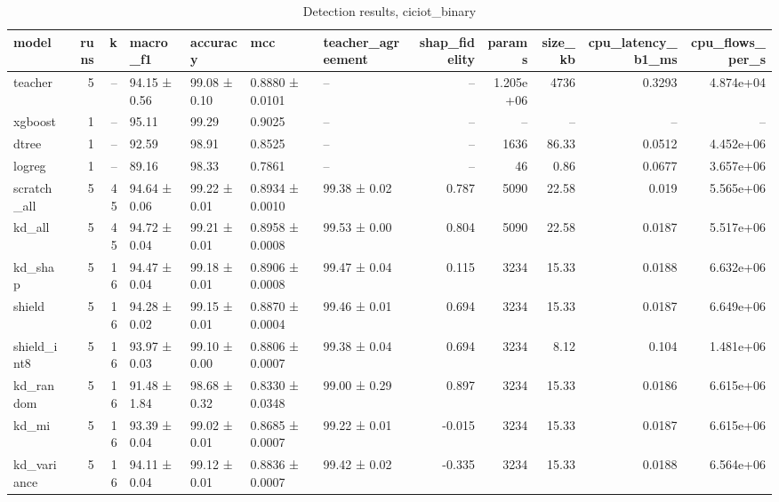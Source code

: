 \begin{table}
\caption{Detection results, ciciot_binary}
\begin{tabular}{lrrllllrrrrr}
\toprule
model & runs & k & macro_f1 & accuracy & mcc & teacher_agreement & shap_fidelity & params & size_kb & cpu_latency_b1_ms & cpu_flows_per_s \\
\midrule
teacher & 5 & -- & 94.15 ± 0.56 & 99.08 ± 0.10 & 0.8880 ± 0.0101 & -- & -- & 1.205e+06 & 4736 & 0.3293 & 4.874e+04 \\
xgboost & 1 & -- & 95.11 & 99.29 & 0.9025 & -- & -- & -- & -- & -- & -- \\
dtree & 1 & -- & 92.59 & 98.91 & 0.8525 & -- & -- & 1636 & 86.33 & 0.0512 & 4.452e+06 \\
logreg & 1 & -- & 89.16 & 98.33 & 0.7861 & -- & -- & 46 & 0.86 & 0.0677 & 3.657e+06 \\
scratch_all & 5 & 45 & 94.64 ± 0.06 & 99.22 ± 0.01 & 0.8934 ± 0.0010 & 99.38 ± 0.02 & 0.787 & 5090 & 22.58 & 0.019 & 5.565e+06 \\
kd_all & 5 & 45 & 94.72 ± 0.04 & 99.21 ± 0.01 & 0.8958 ± 0.0008 & 99.53 ± 0.00 & 0.804 & 5090 & 22.58 & 0.0187 & 5.517e+06 \\
kd_shap & 5 & 16 & 94.47 ± 0.04 & 99.18 ± 0.01 & 0.8906 ± 0.0008 & 99.47 ± 0.04 & 0.115 & 3234 & 15.33 & 0.0188 & 6.632e+06 \\
shield & 5 & 16 & 94.28 ± 0.02 & 99.15 ± 0.01 & 0.8870 ± 0.0004 & 99.46 ± 0.01 & 0.694 & 3234 & 15.33 & 0.0187 & 6.649e+06 \\
shield_int8 & 5 & 16 & 93.97 ± 0.03 & 99.10 ± 0.00 & 0.8806 ± 0.0007 & 99.38 ± 0.04 & 0.694 & 3234 & 8.12 & 0.104 & 1.481e+06 \\
kd_random & 5 & 16 & 91.48 ± 1.84 & 98.68 ± 0.32 & 0.8330 ± 0.0348 & 99.00 ± 0.29 & 0.897 & 3234 & 15.33 & 0.0186 & 6.615e+06 \\
kd_mi & 5 & 16 & 93.39 ± 0.04 & 99.02 ± 0.01 & 0.8685 ± 0.0007 & 99.22 ± 0.01 & -0.015 & 3234 & 15.33 & 0.0187 & 6.615e+06 \\
kd_variance & 5 & 16 & 94.11 ± 0.04 & 99.12 ± 0.01 & 0.8836 ± 0.0007 & 99.42 ± 0.02 & -0.335 & 3234 & 15.33 & 0.0188 & 6.564e+06 \\
\bottomrule
\end{tabular}
\end{table}
